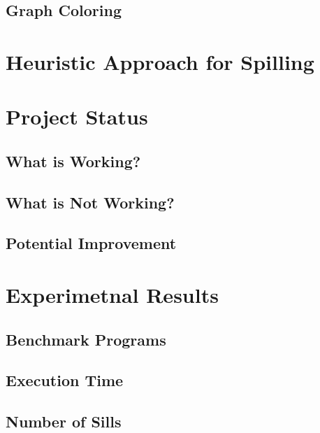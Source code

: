 \documentclass{article}
\begin{document}
\subsection{Graph Coloring}

\section{Heuristic Approach for Spilling}


\section{Project Status}
\subsection{What is Working?}
\subsection{What is Not Working?}
\subsection{Potential Improvement}

\section{Experimetnal Results}
\subsection{Benchmark Programs}
\subsection{Execution Time}
\subsection{Number of Sills}


\end{document}
